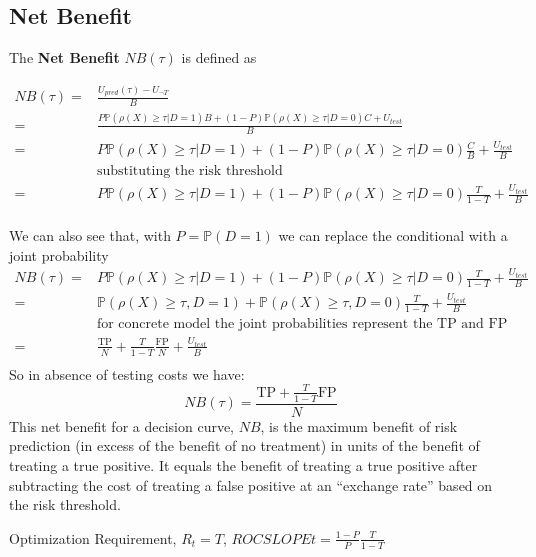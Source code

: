 \subsection{Net Benefit}
	The \textbf{Net Benefit} $NB(\tau)$ is defined as 
	
	\[
	\begin{aligned}
		NB(\tau) =& \frac{U_{pred}(\tau) - U_{\neg T}}{B} \\
		=& \frac{P \mathbb{P}(\rho(X) \geq \tau | D = 1) B + (1 - P) \mathbb{P}(\rho(X) \geq \tau | D = 0) C + U_{test}}{B} \\
		=& P \mathbb{P}(\rho(X) \geq \tau | D = 1) + (1 - P) \mathbb{P}(\rho(X) \geq \tau | D = 0) \frac{C}{B} + \frac{U_{test} }{B} \\
		& \text{substituting the risk threshold} \\
		=& P \mathbb{P}(\rho(X) \geq \tau | D = 1) + (1 - P) \mathbb{P}(\rho(X) \geq \tau | D = 0) \frac{T}{1 - T} + \frac{U_{test} }{B} \\
	\end{aligned}
	\]
	
	We can also see that, with $P = \mathbb{P}(D=1)$ we can replace the conditional with a joint probability
	\[
	\begin{aligned}
		NB(\tau) =& P \mathbb{P}(\rho(X) \geq \tau | D = 1) + (1 - P) \mathbb{P}(\rho(X) \geq \tau | D = 0) \frac{T}{1 - T} + \frac{U_{test} }{B} \\
		=& \mathbb{P}(\rho(X) \geq \tau , D = 1) + \mathbb{P}(\rho(X) \geq \tau , D = 0) \frac{T}{1 - T} + \frac{U_{test} }{B} \\
		& \text{for concrete model the joint probabilities represent the TP and FP respectively} \\
		=& \frac{\text{TP}}{N} + \frac{T}{1 - T} \frac{\text{FP}}{N} + \frac{U_{test} }{B} \\
	\end{aligned}
	\]
	So in absence of testing costs we have:
	\[
		NB(\tau) = \frac{\text{TP} + \frac{T}{1 - T} \text{FP}}{N}
	\]
	This net benefit for a decision curve, $NB$, is the maximum benefit of risk prediction (in excess of the benefit of no treatment)
	in units of the benefit of treating a true positive. 
	It equals the benefit of treating a true positive after subtracting the cost of treating a false positive at an “exchange rate” based on the risk threshold.
	
	
	
	Optimization Requirement, $R_t = T$,
	$ROCSLOPEt = \frac{1 - P}{P}\frac{T}{1 - T}$
	
	
	
	
	
	
	